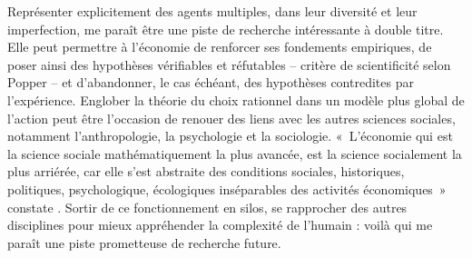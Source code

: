 Représenter explicitement des agents multiples, dans leur diversité et leur imperfection, me paraît être une piste de recherche intéressante à double titre. Elle peut permettre à l’économie de renforcer ses fondements empiriques, de poser ainsi des hypothèses vérifiables et réfutables – critère de scientificité selon Popper – et d’abandonner, le cas échéant, des hypothèses contredites par l’expérience. Englober la théorie du choix rationnel dans un modèle plus global de l’action peut être l’occasion de renouer des liens avec les autres sciences sociales, notamment l’anthropologie, la psychologie et la sociologie. «~L'économie qui est la science sociale mathématiquement la plus avancée, est la science socialement la plus arriérée, car elle s'est abstraite des conditions sociales, historiques, politiques, psychologique, écologiques inséparables des activités économiques~» constate \citet{Morin1999}. Sortir de ce fonctionnement en silos, se rapprocher des autres disciplines pour mieux appréhender la complexité de l'humain : voilà qui me paraît une piste prometteuse de recherche future.





